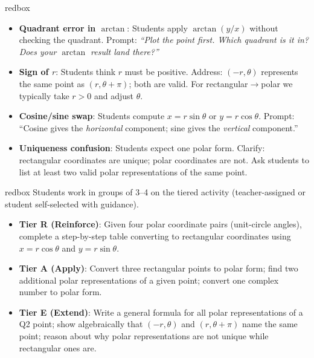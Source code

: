 \documentclass[10pt]{article}
\begin{document}
\vspace{0.08in}

\begin{skillbox}{redbox}
\begin{itemize}[leftmargin=1.4em, itemsep=3pt]
  \item \textbf{Quadrant error in $\arctan$}: Students apply $\arctan(y/x)$
    without checking the quadrant. Prompt: \textit{``Plot the point first.
    Which quadrant is it in? Does your $\arctan$ result land there?''}
  \item \textbf{Sign of $r$}: Students think $r$ must be positive. Address:
    $(-r,\theta)$ represents the same point as $(r,\theta+\pi)$; both are valid.
    For rectangular$\to$polar we typically take $r > 0$ and adjust $\theta$.
  \item \textbf{Cosine/sine swap}: Students compute $x = r\sin\theta$ or
    $y = r\cos\theta$. Prompt: ``Cosine gives the \emph{horizontal} component;
    sine gives the \emph{vertical} component.''
  \item \textbf{Uniqueness confusion}: Students expect one polar form. Clarify:
    rectangular coordinates are unique; polar coordinates are not. Ask students
    to list at least two valid polar representations of the same point.
\end{itemize}
\end{skillbox}

\vspace{0.08in}

\begin{skillbox}{redbox}
Students work in groups of 3--4 on the tiered activity (teacher-assigned or
student self-selected with guidance).

\begin{itemize}[leftmargin=1.4em, itemsep=4pt]
  \item \textbf{Tier R (Reinforce)}: Given four polar coordinate pairs
    (unit-circle angles), complete a step-by-step table converting to
    rectangular coordinates using $x = r\cos\theta$ and $y = r\sin\theta$.
  \item \textbf{Tier A (Apply)}: Convert three rectangular points to polar
    form; find two additional polar representations of a given point;
    convert one complex number to polar form.
  \item \textbf{Tier E (Extend)}: Write a general formula for all polar
    representations of a Q2 point; show algebraically that $(-r,\theta)$ and
    $(r,\theta+\pi)$ name the same point; reason about why polar representations
    are not unique while rectangular ones are.
\end{itemize}
\end{skillbox}
\end{document}
